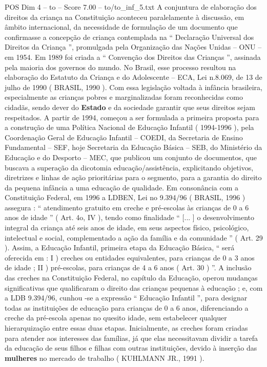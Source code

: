 \begin{textsample}{POS Dim 4 – to – Score 7.00 – to/to\_inf\_5.txt}
A conjuntura de elaboração dos direitos da criança na Constituição aconteceu paralelamente à discussão, em âmbito internacional, da necessidade de formulação de um documento que confirmasse a concepção de criança contemplada na “ Declaração Universal dos Direitos da Criança ”, promulgada pela Organização das Nações Unidas – ONU – em 1954.
Em 1989 foi criada a “ Convenção dos Direitos das Crianças ”, assinada pela maioria dos governos do mundo.
No Brasil, esse processo resultou na elaboração do Estatuto da Criança e do Adolescente – ECA, Lei n.8.069, de 13 de julho de 1990 ( BRASIL, 1990 ).
Com essa legislação voltada à infância brasileira, especialmente as crianças pobres e marginalizadas foram reconhecidas como cidadãs, sendo dever do \textbf{Estado} e da sociedade garantir que seus direitos sejam respeitados.
A partir de 1994, começou a ser formulada a primeira proposta para a construção de uma Política Nacional de Educação Infantil ( 1994-1996 ), pela Coordenação Geral de Educação Infantil – COEDI, da Secretaria de Ensino Fundamental – SEF, hoje Secretaria da Educação Básica – SEB, do Ministério da Educação e do Desporto – MEC, que publicou um conjunto de documentos, que buscava a superação da dicotomia educação/assistência, explicitando objetivos, diretrizes e linhas de ação prioritárias para o segmento, para a garantia do direito da pequena infância a uma educação de qualidade.
Em consonância com a Constituição Federal, em 1996 a LDBEN, Lei no 9.394/96 ( BRASIL, 1996 ) assegura : “ atendimento gratuito em creche e pré-escolas às crianças de 0 a 6 anos de idade ” ( Art. 4o, IV ), tendo como finalidade “ [... ] o desenvolvimento integral da criança até seis anos de idade, em seus aspectos físico, psicológico, intelectual e social, complementado a ação da família e da comunidade ” ( Art. 29 ).
Assim, a Educação Infantil, primeira etapa da Educação Básica, “ será oferecida em : I ) creches ou entidades equivalentes, para crianças de 0 a 3 anos de idade ; II ) pré-escolas, para crianças de 4 a 6 anos ( Art. 30 ) ”.
A inclusão das creches na Constituição Federal, no capítulo da Educação, operou mudanças significativas que qualificaram o direito das crianças pequenas à educação ; e, com a LDB 9.394/96, cunhou -se a expressão “ Educação Infantil ”, para designar todas as instituições de educação para crianças de 0 a 6 anos, diferenciando a creche da pré-escola apenas no quesito idade, sem estabelecer qualquer hierarquização entre essas duas etapas.
Inicialmente, as creches foram criadas para atender aos interesses das famílias, já que elas necessitavam dividir a tarefa da educação de seus filhos e filhas com outras instituições, devido à inserção das \textbf{mulheres} no mercado de trabalho ( KUHLMANN JR., 1991 ).

\end{textsample}
